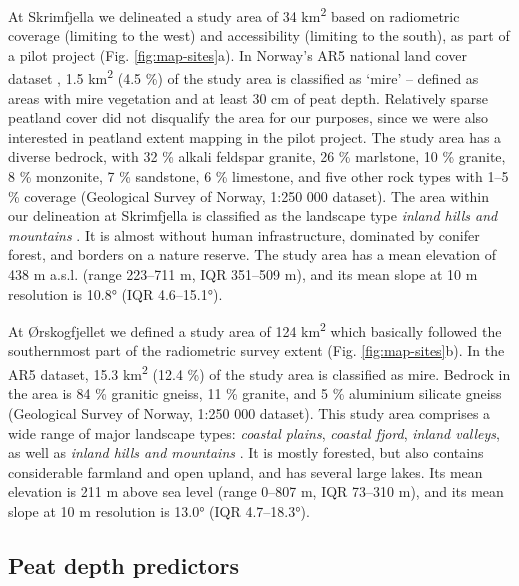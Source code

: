 \documentclass[soil, manuscript]{copernicus}
\begin{document}
At Skrimfjella we delineated a study area of 34 km\textsuperscript{2} based on radiometric coverage (limiting to the west) and accessibility (limiting to the south), as part of a pilot project (Fig. \ref{fig:map-sites}a).
In Norway's AR5 national land cover dataset \citep[``areal resources in scale 1:5000'',][]{ahlstromAR5Klassifikasjonssystem2019}, 1.5 km\textsuperscript{2} (4.5 \%) of the study area is classified as `mire' -- defined as areas with mire vegetation and at least 30 cm of peat depth.
Relatively sparse peatland cover did not disqualify the area for our purposes, since we were also interested in peatland extent mapping in the pilot project.
The study area has a diverse bedrock, with 32 \% alkali feldspar granite, 26 \% marlstone, 10 \% granite, 8 \% monzonite, 7 \% sandstone, 6 \% limestone, and five other rock types with 1--5 \% coverage (Geological Survey of Norway, 1:250 000 dataset).
The area within our delineation at Skrimfjella is classified as the landscape type \emph{inland hills and mountains} \citep{simensenDiversityDistributionLandscape2021}.
It is almost without human infrastructure, dominated by conifer forest, and borders on a nature reserve.
The study area has a mean elevation of 438 m a.s.l. (range 223--711 m, IQR 351--509 m), and its mean slope at 10 m resolution is 10.8° (IQR 4.6--15.1°).

At Ørskogfjellet we defined a study area of 124 km\textsuperscript{2} which basically followed the southernmost part of the radiometric survey extent (Fig. \ref{fig:map-sites}b).
In the AR5 dataset, 15.3 km\textsuperscript{2} (12.4 \%) of the study area is classified as mire.
Bedrock in the area is 84 \% granitic gneiss, 11 \% granite, and 5 \% aluminium silicate gneiss (Geological Survey of Norway, 1:250 000 dataset).
This study area comprises a wide range of major landscape types: \emph{coastal plains}, \emph{coastal fjord}, \emph{inland valleys}, as well as \emph{inland hills and mountains} \citep{simensenDiversityDistributionLandscape2021}.
It is mostly forested, but also contains considerable farmland and open upland, and has several large lakes.
Its mean elevation is 211 m above sea level (range 0--807 m, IQR 73--310 m), and its mean slope at 10 m resolution is 13.0° (IQR 4.7--18.3°).

\subsection{Peat depth predictors}
\end{document}
